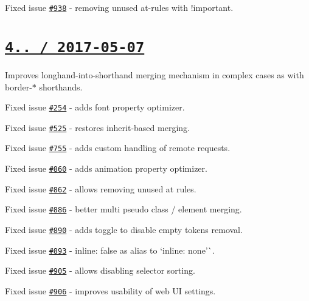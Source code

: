 \begin{DoxyItemize}
\item Fixed issue \href{https://github.com/jakubpawlowicz/clean-css/issues/938}{\tt \#938} -\/ removing unused at-\/rules with {\ttfamily !important}.
\end{DoxyItemize}

\section*{\href{https://github.com/jakubpawlowicz/clean-css/compare/4.0...v4.1.0}{\tt 4.. / 2017-\/05-\/07} }


\begin{DoxyItemize}
\item Improves longhand-\/into-\/shorthand merging mechanism in complex cases as with {\ttfamily border-\/$\ast$} shorthands.
\item Fixed issue \href{https://github.com/jakubpawlowicz/clean-css/issues/254}{\tt \#254} -\/ adds {\ttfamily font} property optimizer.
\item Fixed issue \href{https://github.com/jakubpawlowicz/clean-css/issues/525}{\tt \#525} -\/ restores {\ttfamily inherit}-\/based merging.
\item Fixed issue \href{https://github.com/jakubpawlowicz/clean-css/issues/755}{\tt \#755} -\/ adds custom handling of remote requests.
\item Fixed issue \href{https://github.com/jakubpawlowicz/clean-css/issues/860}{\tt \#860} -\/ adds {\ttfamily animation} property optimizer.
\item Fixed issue \href{https://github.com/jakubpawlowicz/clean-css/issues/862}{\tt \#862} -\/ allows removing unused at rules.
\item Fixed issue \href{https://github.com/jakubpawlowicz/clean-css/issues/886}{\tt \#886} -\/ better multi pseudo class / element merging.
\item Fixed issue \href{https://github.com/jakubpawlowicz/clean-css/issues/890}{\tt \#890} -\/ adds toggle to disable empty tokens removal.
\item Fixed issue \href{https://github.com/jakubpawlowicz/clean-css/issues/893}{\tt \#893} -\/ {\ttfamily inline\+: false} as alias to `inline\+: \textquotesingle{}none'\`{}.
\item Fixed issue \href{https://github.com/jakubpawlowicz/clean-css/issues/905}{\tt \#905} -\/ allows disabling selector sorting.
\item Fixed issue \href{https://github.com/jakubpawlowicz/clean-css/issues/906}{\tt \#906} -\/ improves usability of web UI settings.

\end{DoxyItemize}
